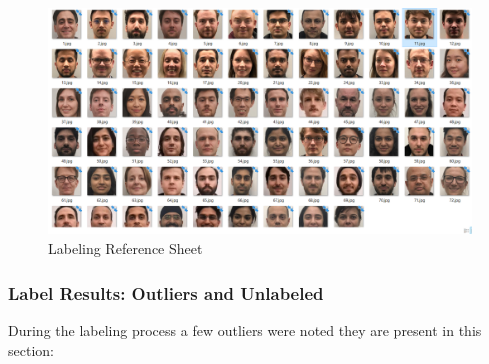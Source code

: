 \documentclass[11pt]{article}
\begin{document}
        \begin{figure}[ht]
            \centering
            \includegraphics[height=6cm]{./Images/labeling/cheatsheet.png}
            \caption{Labeling Reference Sheet}
            \label{fig:label:cheatsheet}
        \end{figure}

    \subsubsection{Label Results: Outliers and Unlabeled}\label{sec:face_labeling:outliers}
        During the labeling process a few outliers were noted they are present in this section:
\end{document}
